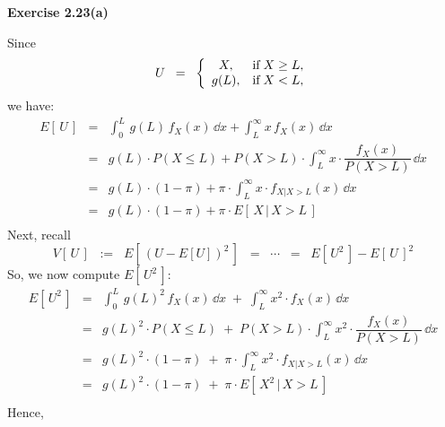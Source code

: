 
\noindent
\textbf{Exercise 2.23(a)}

\vskip 0.3cm
\noindent
Since
\begin{equation*}
U
\;\; = \;\;
\left\{\begin{array}{cl}
X, & \textnormal{if}\; X \geq L, \\
g(L), & \textnormal{if}\; X < L,
\end{array}\right.
\end{equation*}
we have:
\begin{eqnarray*}
E[\,U\,]
&=& \int_{0}^{L}\,g(L)\,f_{X}(x)\,\dd x + \int_{L}^{\infty} x\,f_{X}(x)\,\dd x \\
&=& g(L) \cdot P(X \leq L) + P(X > L)\cdot\int_{L}^{\infty} x\cdot\dfrac{f_{X}(x)}{P(X > L)}\,\dd x \\
&=& g(L) \cdot (1 - \pi) + \pi\cdot\int_{L}^{\infty} x\cdot f_{X\vert X>L}(x)\,\dd x \\
&=& g(L) \cdot (1 - \pi) + \pi\cdot E[\,X\,\vert\, X > L\,] \\
\end{eqnarray*}
Next, recall
\begin{equation*}
V[\,U\,]
\;\;:=\;\; E[\,(U - E[U])^{2}\,]
\;\; =\;\; \cdots
\;\; =\;\; E[\,U^{2}\,] - E[\,U\,]^{2}
\end{equation*}
So, we now compute $E[\,U^{2}\,]$:
\begin{eqnarray*}
E[\,U^{2}\,]
&=& \int_{0}^{L}\,g(L)^{2}\,f_{X}(x)\,\dd x \;+\; \int^{\infty}_{L} x^{2}\cdot f_{X}(x)\,\dd x \\
&=& g(L)^{2}\cdot P(X \leq L) \;+\; P(X > L)\cdot\int^{\infty}_{L} x^{2}\cdot\dfrac{f_{X}(x)}{P(X>L)}\,\dd x \\
&=& g(L)^{2}\cdot(1-\pi) \;+\; \pi\cdot\int^{\infty}_{L} x^{2}\cdot f_{X|X>L}(x)\,\dd x \\
&=& g(L)^{2}\cdot(1-\pi) \;+\; \pi\cdot E[\,X^{2}\,\vert\,X>L\,]\\
\end{eqnarray*}
Hence,
